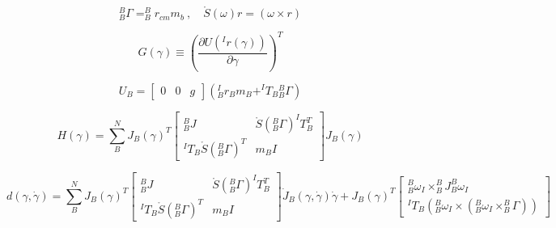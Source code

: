 \documentclass[12pt]{report}
\begin{document}
\[
^B_B\Gamma = ^B_Br_{cm}m_b~,\quad \mathring{S}(\omega)r=(\omega\times r)
\]

\[
G(\gamma) \equiv \left(\frac{\partial U(^Ir(\gamma))}{\partial\gamma}\right)^T
\]

\[
U_B = \begin{bmatrix} 0 & 0 & g\end{bmatrix}\left(^I_Br_Bm_B + ^IT_B{}_B^B\Gamma\right)
\]

\begin{equation}
  \renewcommand{\arraystretch}{1.5}
  H(\gamma) = \sum_B^N J_B(\gamma)^T
  \begin{bmatrix}
    ^B_BJ & \mathring{S}(^B_B\Gamma) ^IT_B^T\\
    ^IT_B\mathring{S}(^B_B\Gamma)^T & m_BI
  \end{bmatrix}
  J_B(\gamma)
\end{equation}

\begin{equation}
  \renewcommand{\arraystretch}{1.5}
  d(\gamma,\dot{\gamma}) = \sum_B^N J_B(\gamma)^T
  \begin{bmatrix}
    ^B_BJ & \mathring{S}(^B_B\Gamma) ^IT_B^T\\
    ^IT_B\mathring{S}(^B_B\Gamma)^T & m_BI
  \end{bmatrix}
  \dot{J}_B(\gamma,\dot{\gamma})\dot{\gamma}+J_B(\gamma)^T
  \begin{bmatrix}
    ^B_B\omega_I \times ^B_BJ ^B_B\omega_I \\
    ^IT_B\left(^B_B\omega_I\times(^B_B\omega_I\times^B_B\Gamma)\right)
  \end{bmatrix}
\end{equation}
\end{document}
